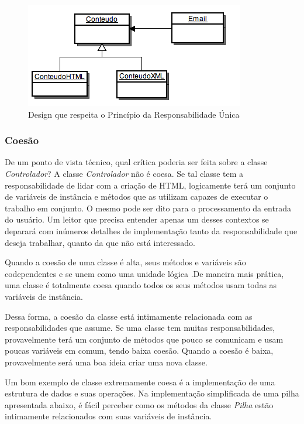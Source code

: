 \begin{figure}[!t]
\begin{centering}
\includegraphics[scale=0.7]{imagens/email.png}
\par\end{centering}

\caption{Design que respeita o Princípio da Responsabilidade Única \label{img:email}}

\end{figure}

\subsubsection{Coesão}
De um ponto de vista técnico, qual crítica poderia ser feita sobre a classe \textit{Controlador}? 
A classe \textit{Controlador} não é coesa. Se tal classe tem a responsabilidade de lidar com a criação de HTML, logicamente terá um conjunto de variáveis de instância e métodos que as utilizam capazes de executar o trabalho em conjunto. O mesmo pode ser dito para o processamento da entrada do usuário. Um leitor que precisa entender apenas um desses contextos se deparará com inúmeros detalhes de implementação tanto da responsabilidade que deseja trabalhar, quanto da que não está interessado.
	
Quando a coesão de uma classe é alta, seus métodos e variáveis são codependentes e se unem como uma unidade lógica \citep{Beck2007}.De maneira mais prática, uma classe é totalmente coesa quando todos os seus métodos usam todas as variáveis de instância.
	
Dessa forma, a coesão da classe está intimamente relacionada com as responsabilidades que assume. Se uma classe tem muitas 
responsabilidades, provavelmente terá um conjunto de métodos que pouco se comunicam e usam poucas variáveis em comum, tendo baixa 
coesão. Quando a coesão é baixa, provavelmente será uma boa ideia criar uma nova classe.

Um bom exemplo de classe extremamente coesa é a implementação de uma estrutura de dados e suas operações. Na implementação 
simplificada de uma pilha apresentada abaixo, é fácil perceber como os métodos da classe \textit{Pilha} estão intimamente 
relacionados com suas variáveis de instância.

